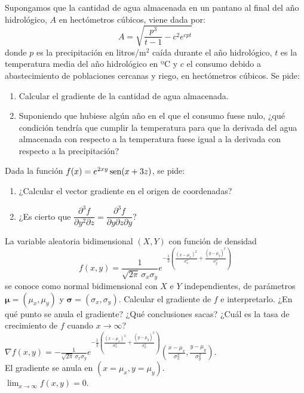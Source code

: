 {Supongamos que la cantidad de agua almacenada en un pantano al final del año hidrológico, $A$ en hectómetros cúbicos, viene dada por:
\[
A = \sqrt {\frac{{p^3 }}{{t - 1}} - c^2 e^{cpt}}
\]
donde $p$ es la precipitación en litros/m$^2$ caí­da durante el año hidrológico, $t$ es la temperatura media del año hidrológico en ºC y $c$ el consumo debido a abastecimiento de poblaciones cercanas y riego, en hectómetros cúbicos.
Se pide:
\begin{enumerate}
\item Calcular el gradiente de la cantidad de agua almacenada.
\item Suponiendo que hubiese algún año en el que el consumo fuese nulo, ¿qué condición tendría­ que cumplir la temperatura para que la derivada del agua almacenada con respecto a la temperatura fuese igual a la derivada con respecto a la precipitación?
\end{enumerate}
}


{Dada la función $f(x)=e^{2xy}\operatorname{sen}(x+3z)$, se pide:
\begin{enumerate}
  \item ¿Calcular el vector gradiente en el origen de coordenadas?
  \item ¿Es cierto que $\dfrac{\partial^3f}{\partial y^2\partial z}=\dfrac{\partial^3f}{\partial y\partial z\partial y}?$
\end{enumerate}
}


{La variable aleatoria bidimensional $(X,Y)$ con función de densidad
\[
f(x,y) = \frac{1}{\sqrt{2\pi}\, \sigma_x\sigma_y} e^{-\frac{1}{2}\left(\frac{(x-\mu_x)^2}{\sigma_x^2}+\frac{(y-\mu_y)^2}{\sigma_y^2}\right)}
\]
se conoce como normal bidimensional con $X$ e $Y$ independientes, de parámetros $\mathbf{\mu}=(\mu_x,\mu_y)$ y $\mathbf{\sigma}=(\sigma_x,\sigma_y)$.
Calcular el gradiente de $f$ e interpretarlo. ¿En qué punto se anula el gradiente? ¿Qué conclusiones sacas? ¿Cuál es la tasa de crecimiento de $f$ cuando $x\rightarrow \infty$?
}
{$\nabla f(x,y) = -\frac{1}{\sqrt{2\pi}\, \sigma_x\sigma_y} e^{-\frac{1}{2}\left(\frac{(x-\mu_x)^2}{\sigma_x^2}+\frac{(y-\mu_y)^2}{\sigma_y^2}\right)} \left(\frac{x-\mu_x}{\sigma_x^2}, \frac{y-\mu_y}{\sigma_y^2}\right)$.\\
El gradiente se anula en $(x=\mu_x, y=\mu_y)$.\\
$\lim_{x\rightarrow \infty}f(x,y) = 0$. 
}
{
}


